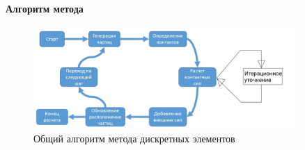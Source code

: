 \documentclass[c]{beamer}  %
\begin{document}
\begin{frame}
\frametitle{\insertsection} 
\framesubtitle{Алгоритм метода}

\begin{figure}[h!]
	\centering
	\includegraphics[width=0.9\textwidth]{algorithm}
	\caption{Общий алгоритм метода дискретных элементов}
\end{figure} 
\end{frame}
\end{document}
